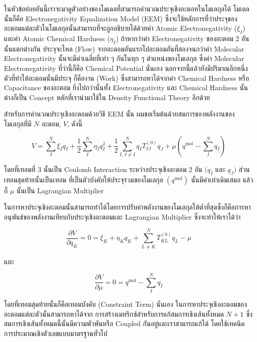 ในหัวข้อย่อยอันนี้เราจะมาดูตัวอย่างของโมเดลที่สามารถคำนวณประจุเชิงอะตอทในโมเลกุลได้ โมเดลนั้นก็คือ Electronegativity Equalization 
Model (EEM) ซึ่งจะใช้หลักการที่ว่าประจุของอะตอมแต่ละตัวในโมเลกุลนั้นสามารถที่จะถูกอธิบายได้ด้วยค่า Atomic Electronegativity ($\xi_{I}$) 
และค่า Atomic Chemical Hardness ($\eta_{I}$) ถ้าหากว่าค่า Electronegativity ของอะตอม 2 อันนั้นแตกต่างกัน ประจุจะไหล (Flow) 
จากอะตอมอันแรกไปอะตอมอันที่สองจนกว่าค่า Molecular Electronegativity นั้นจะมีค่าเฉลี่ยที่เท่า ๆ กันในทุก ๆ ตำแหน่งของโมเลกุล
ซึ่งค่า Molecular Electronegativity ที่ว่านี้ก็คือ Chemical Potential นั่นเอง นอกจากนี้แล้วยังมีปริมาณอีกหนึ่งตัวที่ทำให้อะตอมนั้นมีประจุ%
ก็คืองาน (Work) ซึ่งสามารถหาได้จากค่า Chemical Hardness หรือ Capacitance ของอะตอม ยิ่งไปกว่านั้นทั้ง Electronegativity และ 
Chemical Hardness นั้นต่างก็เป็น Concept หลักที่เรานำมาใช้ใน Density Functional Theory อีกด้วย 

สำหรับการคำนวณประจุเชิงอะตอมด้วยวิธี EEM นั้น ผมขอเริ่มต้นด้วยสมการของพลังงานของโมเลกุลที่มี $N$ อะตอม, $V$, ดังนี้

\begin{equation}
    V 
    = 
    \sum_I^N \xi_I q_I+\frac{1}{2} 
    \sum_I^N \eta_I q_I^2+\frac{1}{2} 
    \sum_{I, J \neq I}^N q_I T_{I J}^{(0)} q_J 
    + \mu\left(q^{\mathrm{mol}}-\sum_I^N q_I\right)
\end{equation}

\noindent โดยที่เทอมที่ 3 นั้นเป็น Coulomb Interaction ระหว่างประจุเชิงอะตอม 2 อัน $(q_I$ และ $q_J)$ ส่วนเทอมสุดท้ายนั้นเป็นเทอม%
ที่เป็นตัวบังคับให้ประจุรวมของโมเลกุล $(q^{\mathrm{mol}})$ นั้นมีค่าเท่าเดิมเสมอ แล้วก็ $\mu$ นั้นเป็น Lagrangian Multiplier 

ในการหาประจุเชิงอะตอมนั้นสามารถทำได้โดยการปรับค่าพลังงานของโมเลกุลให้ต่ำที่สุดซึ่งก็คือการหาอนุพันธ์ของพลังงานเทียบกับประจุเชิงอะตอมและ 
Lagrangian Multiplier ซึ่งจะทำให้เราได้ว่า

\begin{equation}
    \frac{\partial V}{\partial q_K} 
    = 
    0 
    = \xi_K+\eta_K q_K+\sum_{L \neq K}^N T_{K L}^{(0)} q_L-\mu
\end{equation}

\noindent และ 

\begin{equation}
    \frac{\partial V}{\partial \mu}
    = 
    0 
    = 
    q^{\mathrm{mol}}-\sum_I^N q_I
\end{equation}

\noindent โดยที่เทอมสุดท้ายนั้นก็คือเทอมบังคับ (Constraint Term) นั่นเอง ในการหาประจุเชิงอะตอมของอะตอมแต่ละตัวนั้นสามารถหาได้จาก%
การสร้างเมทริกซ์สำหรับการแก้สมการเชิงเส้นทั้งหมด $N+1$ ซึ่งสมการเชิงเส้นทั้งหมดนี้นั้นมีความพัวพันหรือ Coupled กันอยู่และเราสามารถแก้ได้%
โดยใช้เทคนิคการประมาณเชิงตัวเลขแบบมาตรฐานทั่วไป 

